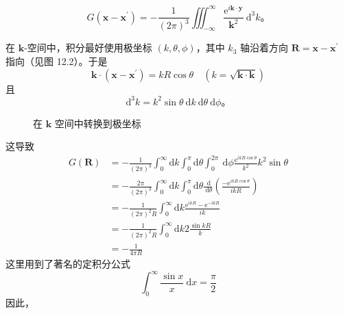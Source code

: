\begin{equation}\label{eq:12.17} 
 G\left(\mathbf{x}-\mathbf{x}^{\prime}\right)=-\frac{1}{(2 \pi)^{3}} \iiint_{-\infty}^{\infty} \frac{\mathrm{e}^{i \mathbf{k} \cdot \mathbf{y}}}{\mathbf{k}^{2}} \mathrm{~d}^{3} k。 
 \end{equation}

在 $\mathbf{k}$-空间中，积分最好使用极坐标 $(k, \theta, \phi)$，其中
$k_{3}$ 轴沿着方向 $\mathbf{R}=\mathbf{x}-\mathbf{x}^{\prime}$
指向（见图 12.2）。于是
 $$
\mathbf{k} \cdot\left(\mathbf{x}-\mathbf{x}^{\prime}\right)=k R \cos \theta \quad(k=\sqrt{\mathbf{k} \cdot \mathbf{k}})
$$
且
 $$
\mathrm{d}^{3} k=k^{2} \sin \theta \mathrm{~d} k \mathrm{~d} \theta \mathrm{~d} \phi。
$$
\begin{figure}
  \centering
  \caption{在 $\mathbf{k}$ 空间中转换到极坐标}
  \label{12.2}
\end{figure}


这导致
 $$
\begin{aligned}
G(\mathbf{R}) & =-\frac{1}{(2 \pi)^{3}} \int_{0}^{\infty} \mathrm{d} k \int_{0}^{\pi} \mathrm{d} \theta \int_{0}^{2 \pi} \mathrm{~d} \phi \frac{\mathrm{e}^{i k R \cos \theta}}{k^{2}} k^{2} \sin \theta \\
& =-\frac{2 \pi}{(2 \pi)^{3}} \int_{0}^{\infty} \mathrm{d} k \int_{0}^{\pi} \mathrm{d} \theta \frac{\mathrm{~d}}{\mathrm{~d} \theta}\left(\frac{-\mathrm{e}^{i k R \cos \theta}}{i k R}\right) \\
& =-\frac{1}{(2 \pi)^{2} R} \int_{0}^{\infty} \mathrm{d} k \frac{\mathrm{e}^{i k R}-\mathrm{e}^{-i k R}}{i k} \\
& =-\frac{1}{(2 \pi)^{2} R} \int_{0}^{\infty} \mathrm{d} k 2 \frac{\sin k R}{k} \\
& =-\frac{1}{4 \pi R}
\end{aligned}
$$
这里用到了著名的定积分公式
 $$
\int_{0}^{\infty} \frac{\sin x}{x} \mathrm{~d} x=\frac{\pi}{2}
$$
因此，

